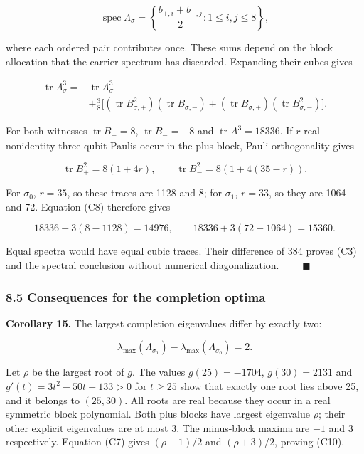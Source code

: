 \documentclass[11pt,a4paper]{article}
\newcommand{\gt}{>}
\begin{document}
\[\operatorname{spec}\Lambda_\sigma=
\left\{\frac{b_{+,i}+b_{-,j}}2:1\le i,j\le8\right\},
\tag{C7}\]

where each ordered pair contributes once. These sums depend on the block allocation that the carrier
spectrum has discarded. Expanding their cubes gives

\[\begin{aligned}
\operatorname{tr}\Lambda_\sigma^3={}&\operatorname{tr}A_\sigma^3\\ &+\frac38\bigl[
(\operatorname{tr}B_{\sigma,+}^2)(\operatorname{tr}B_{\sigma,-})
+(\operatorname{tr}B_{\sigma,+})(\operatorname{tr}B_{\sigma,-}^2)
\bigr].
\end{aligned}
\tag{C8}\]

For both witnesses \(\operatorname{tr}B_+=8\), \(\operatorname{tr}B_-=-8\) and
\(\operatorname{tr}A^3=18336\). If \(r\) real nonidentity three-qubit Paulis occur in the plus block,
Pauli orthogonality gives

\[\operatorname{tr}B_+^2=8(1+4r),\qquad
\operatorname{tr}B_-^2=8(1+4(35-r)).
\tag{C9}\]

For \(\sigma_0\), \(r=35\), so these traces are 1128 and 8; for \(\sigma_1\), \(r=33\), so they are 1064 and
72. Equation (C8) therefore gives

\[18336+3(8-1128)=14976,\qquad
18336+3(72-1064)=15360.\]

Equal spectra would have equal cubic traces. Their difference of 384 proves (C3) and the spectral
conclusion without numerical diagonalization. \(\qquad\blacksquare\)

\subsubsection{8.5 Consequences for the completion optima}\label{85-consequences-for-the-completion-optima}

\textbf{Corollary 15.} The largest completion eigenvalues differ by exactly two:

\[\lambda_{\max}(\Lambda_{\sigma_1})-
\lambda_{\max}(\Lambda_{\sigma_0})=2.
\tag{C10}\]

Let \(\rho\) be the largest root of \(g\). The values \(g(25)=-1704\), \(g(30)=2131\) and
\(g'(t)=3t^2-50t-133\gt 0\) for \(t\ge25\) show that exactly one root lies above 25, and it belongs to
\((25,30)\). All roots are real because they occur in a real symmetric block polynomial. Both plus
blocks have largest eigenvalue \(\rho\); their other explicit eigenvalues are at most 3. The minus-block
maxima are \(-1\) and \(3\) respectively. Equation (C7) gives \((\rho-1)/2\) and \((\rho+3)/2\), proving
(C10).
\end{document}
